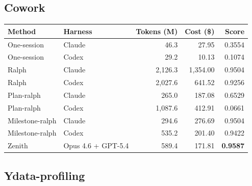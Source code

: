 \documentclass[11pt,a4paper]{article}
\newcommand{\code}[1]{#1}
\begin{document}
\subsection*{Cowork}

\noindent\begin{tabular}{@{}llrrr@{}}
\toprule
\rowcolor{tablehead}\textbf{\color{white}Method} & \textbf{\color{white}Harness} & \textbf{\color{white}Tokens (M)} & \textbf{\color{white}Cost (\$)} & \textbf{\color{white}Score} \\
\midrule
\code{One-session}    & Claude              & 46.3   & 27.95      & 0.3554 \\
\rowcolor{tableband}
\code{One-session}    & Codex               & 29.2   & 10.13      & 0.1074 \\
\code{Ralph}          & Claude              & 2{,}126.3 & 1{,}354.00 & 0.9504 \\
\rowcolor{tableband}
\code{Ralph}          & Codex               & 2{,}027.6 & 641.52     & 0.9256 \\
\code{Plan-ralph}     & Claude              & 265.0  & 187.08     & 0.6529 \\
\rowcolor{tableband}
\code{Plan-ralph}     & Codex               & 1{,}087.6 & 412.91     & 0.0661 \\
\code{Milestone-ralph}& Claude              & 294.6  & 276.69     & 0.9504 \\
\rowcolor{tableband}
\code{Milestone-ralph}& Codex               & 535.2  & 201.40     & 0.9422 \\
\code{Zenith}         & Opus 4.6 + GPT-5.4  & 589.4  & 171.81     & \textbf{0.9587} \\
\bottomrule
\end{tabular}

\subsection*{Ydata-profiling}
\end{document}

